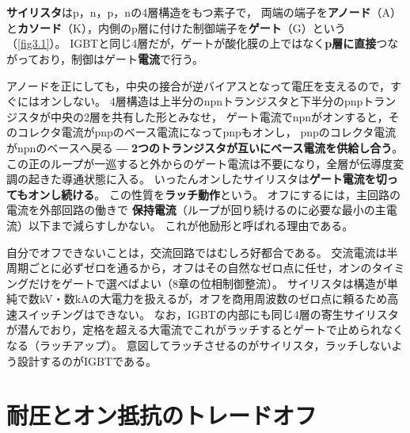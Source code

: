 \section{}
\label{sec3.6}

\textbf{サイリスタ}はp，n，p，nの4層構造をもつ素子で，
両端の端子を\textbf{アノード}（A）と\textbf{カソード}（K），内側のp層に付けた制御端子を\textbf{ゲート}（G）という（\ref{fig3.1}）。
IGBTと同じ4層だが，ゲートが酸化膜の上ではなく\textbf{p層に直接}つながっており，制御はゲート\textbf{電流}で行う。

アノードを正にしても，中央の接合が逆バイアスとなって電圧を支えるので，すぐにはオンしない。
4層構造は上半分のnpnトランジスタと下半分のpnpトランジスタが中央の2層を共有した形とみなせ，
ゲート電流でnpnがオンすると，そのコレクタ電流がpnpのベース電流になってpnpもオンし，
pnpのコレクタ電流がnpnのベースへ戻る ― \textbf{2つのトランジスタが互いにベース電流を供給し合う}。
この正のループが一巡すると外からのゲート電流は不要になり，全層が伝導度変調の起きた導通状態に入る。
いったんオンしたサイリスタは\textbf{ゲート電流を切ってもオンし続ける}。
この性質を\textbf{ラッチ動作}という。
オフにするには，主回路の電流を外部回路の働きで
\textbf{保持電流}（ループが回り続けるのに必要な最小の主電流）以下まで減らすしかない。
これが他励形と呼ばれる理由である。

自分でオフできないことは，交流回路ではむしろ好都合である。
交流電流は半周期ごとに必ずゼロを通るから，オフはその自然なゼロ点に任せ，オンのタイミングだけをゲートで選べばよい（8章の位相制御整流）。
サイリスタは構造が単純で数kV・数kAの大電力を扱えるが，オフを商用周波数のゼロ点に頼るため高速スイッチングはできない。
なお，IGBTの内部にも同じ4層の寄生サイリスタが潜んでおり，定格を超える大電流でこれがラッチするとゲートで止められなくなる（ラッチアップ）。
意図してラッチさせるのがサイリスタ，ラッチしないよう設計するのがIGBTである。

\section{耐圧とオン抵抗のトレードオフ}
\label{sec3.7}

\subsection{}

